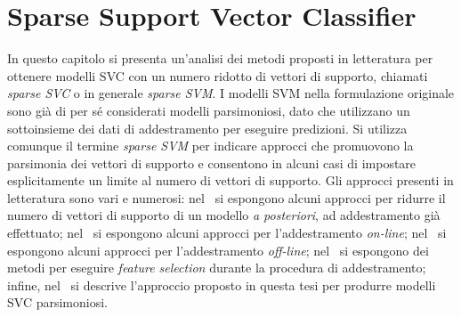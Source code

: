 \chapter{Sparse Support Vector Classifier}\label{chap:sparse_svc}
In questo capitolo si presenta un'analisi dei metodi proposti in letteratura per ottenere modelli SVC con un numero ridotto di vettori di supporto, chiamati \emph{sparse SVC} o in generale \emph{sparse SVM}.
I modelli SVM nella formulazione originale sono già di per sé considerati modelli parsimoniosi, dato che utilizzano un sottoinsieme dei dati di addestramento per eseguire predizioni. 
Si utilizza comunque il termine \emph{sparse SVM} per indicare approcci che promuovono la parsimonia dei vettori di supporto e consentono in alcuni casi di impostare esplicitamente un limite al numero di vettori di supporto. 
Gli approcci presenti in letteratura sono vari e numerosi:
nel~ si espongono alcuni approcci per ridurre il numero di vettori di supporto di un modello \emph{a posteriori}, ad addestramento già effettuato; nel~ si espongono alcuni approcci per l'addestramento \emph{on-line}; nel~ si espongono alcuni approcci per l'addestramento \emph{off-line}; nel~ si espongono dei metodi per eseguire \emph{feature selection} durante la procedura di addestramento; infine, nel~ si descrive l'approccio proposto in questa tesi per produrre modelli SVC parsimoniosi.

